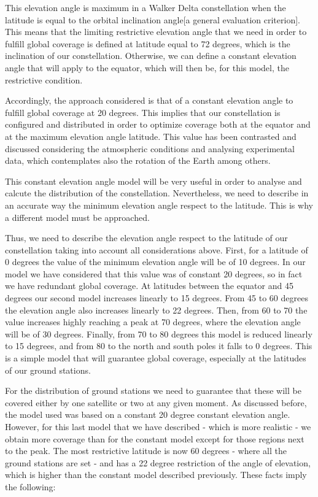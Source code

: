 This elevation angle is maximum in a Walker Delta constellation when the latitude is equal to the orbital inclination angle[a general evaluation criterion]. This means that the limiting restrictive elevation angle that we need in order to fulfill global coverage is defined at latitude equal to 72 degrees, which is the inclination of our constellation. Otherwise, we can define a constant elevation angle that will apply to the equator, which will then be, for this model, the restrictive condition.

Accordingly, the approach considered is that of a constant elevation angle to fulfill global coverage at 20 degrees. This implies that our constellation is configured and distributed in order to optimize coverage both at the equator and at the maximum elevation angle latitude. This value has been contrasted and discussed considering the atmospheric conditions and analysing experimental data, which contemplates also the rotation of the Earth among others.

This constant elevation angle model will be very useful in order to analyse and calcute the distribution of the constellation. Nevertheless, we need to describe in an accurate way the minimum elevation angle respect to the latitude. This is why a different model must be approached.

Thus, we need to describe the elevation angle respect to the latitude of our constellation taking into account all considerations above. First, for a latitude of 0 degrees the value of the minimum elevation angle will be of 10 degrees. In our model we have considered that this value was of constant 20 degrees, so in fact we have redundant global coverage. At latitudes between the equator and 45 degrees our second model increases linearly to 15 degrees. From 45 to 60 degrees the elevation angle also increases linearly to 22 degrees. Then, from 60 to 70 the value increases highly reaching a peak at 70 degrees, where the elevation angle will be of 30 degrees. Finally, from 70 to 80 degrees this model is reduced linearly to 15 degrees, and from 80 to the north and south poles it falls to 0 degrees. This is a simple model that will guarantee global coverage, especially at the latitudes of our ground stations.

For the distribution of ground stations we need to guarantee that these will be covered either by one satellite or two at any given moment. As discussed before, the model used was based on a constant 20 degree constant elevation angle. However, for this last model that we have described - which is more realistic - we obtain more coverage than for the constant model except for those regions next to the peak. The most restrictive latitude is now 60 degrees - where all the ground stations are set - and has a 22 degree restriction of the angle of elevation, which is higher than the constant model described previously. These facts imply the following:

